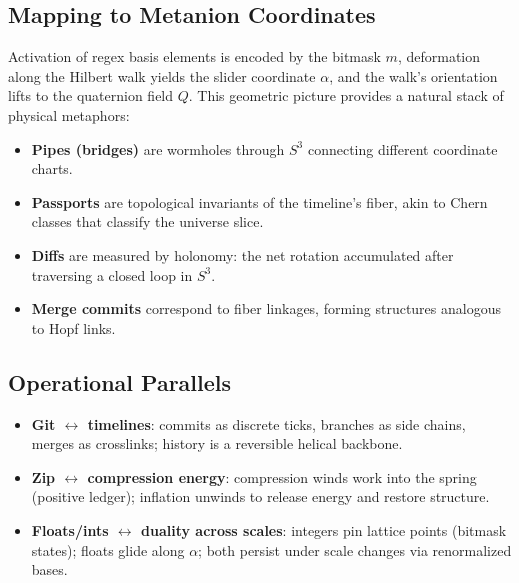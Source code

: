 \documentclass{article}
\begin{document}
\subsection{Mapping to Metanion Coordinates}
Activation of regex basis elements is encoded by the bitmask $m$, deformation along the Hilbert walk yields the slider coordinate $\alpha$, and the walk's orientation lifts to the quaternion field $Q$. This geometric picture provides a natural stack of physical metaphors:
\begin{itemize}
    \item \textbf{Pipes (bridges)} are wormholes through $S^3$ connecting different coordinate charts.
    \item \textbf{Passports} are topological invariants of the timeline's fiber, akin to Chern classes that classify the universe slice.
    \item \textbf{Diffs} are measured by holonomy: the net rotation accumulated after traversing a closed loop in $S^3$.
    \item \textbf{Merge commits} correspond to fiber linkages, forming structures analogous to Hopf links.
\end{itemize}

\subsection{Operational Parallels}
\begin{itemize}
  \item \textbf{Git $\leftrightarrow$ timelines}: commits as discrete ticks, branches as side chains, merges as crosslinks; history is a reversible helical backbone.
  \item \textbf{Zip $\leftrightarrow$ compression energy}: compression winds work into the spring (positive ledger); inflation unwinds to release energy and restore structure.
  \item \textbf{Floats/ints $\leftrightarrow$ duality across scales}: integers pin lattice points (bitmask states); floats glide along $\alpha$; both persist under scale changes via renormalized bases.
\end{itemize}
\end{document}
